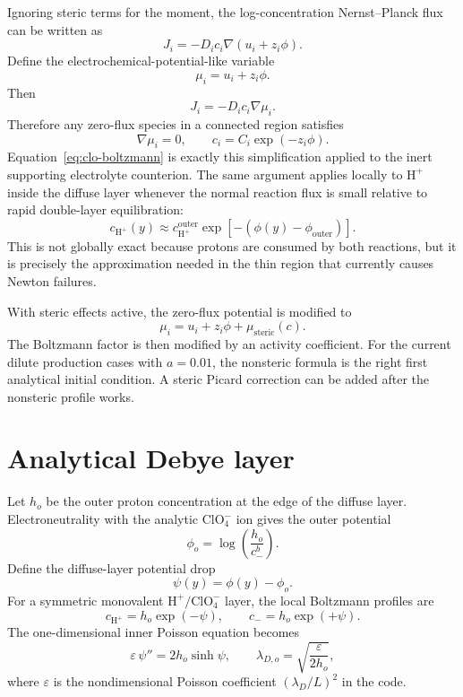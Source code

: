 \documentclass[11pt]{article}
\newcommand{\HH}{\mathrm{H}^{+}}
\newcommand{\ClO}{\mathrm{ClO}_4^{-}}
\newcommand{\epshat}{\varepsilon}
\begin{document}
Ignoring steric terms for the moment, the log-concentration Nernst--Planck
flux can be written as
\begin{equation}
  J_i
  =
  -D_i c_i \nabla(u_i + z_i\phi).
\end{equation}
Define the electrochemical-potential-like variable
\begin{equation}
  \mu_i = u_i + z_i\phi.
\end{equation}
Then
\begin{equation}
  J_i = -D_i c_i \nabla\mu_i.
  \label{eq:mu-flux}
\end{equation}
Therefore any zero-flux species in a connected region satisfies
\[
  \nabla\mu_i = 0,
  \qquad
  c_i = C_i \exp(-z_i\phi).
\]
Equation~\eqref{eq:clo-boltzmann} is exactly this simplification applied to
the inert supporting electrolyte counterion. The same argument applies
locally to \(\HH\) inside the diffuse layer whenever the normal reaction flux
is small relative to rapid double-layer equilibration:
\begin{equation}
  c_{\HH}(y)
  \approx
  c_{\HH}^{\mathrm{outer}}
  \exp[-(\phi(y)-\phi_{\mathrm{outer}})].
  \label{eq:h-inner-boltzmann}
\end{equation}
This is not globally exact because protons are consumed by both reactions, but
it is precisely the approximation needed in the thin region that currently
causes Newton failures.

With steric effects active, the zero-flux potential is modified to
\[
  \mu_i = u_i + z_i\phi + \mu_{\mathrm{steric}}(c).
\]
The Boltzmann factor is then modified by an activity coefficient. For the
current dilute production cases with \(a=0.01\), the nonsteric formula is the
right first analytical initial condition. A steric Picard correction can be
added after the nonsteric profile works.

\section{Analytical Debye layer}

Let \(h_o\) be the outer proton concentration at the edge of the diffuse
layer. Electroneutrality with the analytic \(\ClO\) ion gives the outer
potential
\begin{equation}
  \phi_o = \log\!\left(\frac{h_o}{c_-^b}\right).
\end{equation}
Define the diffuse-layer potential drop
\begin{equation}
  \psi(y) = \phi(y)-\phi_o.
\end{equation}
For a symmetric monovalent \(\HH/\ClO\) layer, the local Boltzmann profiles
are
\begin{equation}
  c_{\HH} = h_o \exp(-\psi),
  \qquad
  c_- = h_o \exp(+\psi).
  \label{eq:symmetric-boltzmann}
\end{equation}
The one-dimensional inner Poisson equation becomes
\begin{equation}
  \epshat\,\psi'' = 2h_o\sinh\psi,
  \qquad
  \lambda_{D,o} = \sqrt{\frac{\epshat}{2h_o}},
  \label{eq:pb-inner}
\end{equation}
where \(\epshat\) is the nondimensional Poisson coefficient
\((\lambda_D/L)^2\) in the code.
\end{document}

